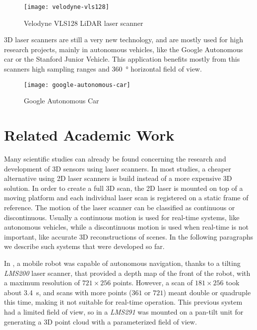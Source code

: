\begin{figure}[h]
    \centering
    \texttt{[image: velodyne-vls128]}
    \caption{Velodyne VLS128 LiDAR laser scanner}
    \label{fig:velodyne-vls128}
\end{figure}

3D laser scanners are still a very new technology, and are mostly used for high research projects, mainly in autonomous vehicles, like the Google Autonomous car \cite{google-self-driving} or the Stanford Junior Vehicle\cite{montemerlo08}. This application benefits mostly from this scanners high sampling ranges and \SI{360}{\degree} horizontal field of view.

\begin{figure}[h]
    \centering
    \texttt{[image: google-autonomous-car]}
    \caption{Google Autonomous Car}
    \label{fig:google-autonomous-car}
\end{figure}

\section{Related Academic Work}

Many scientific studies can already be found concerning the research and development of 3D sensors using laser scanners. In most studies, a cheaper alternative using 2D laser scanners is build instead of a more expensive 3D solution. In order to create a full 3D scan, the 2D laser is mounted on top of a moving platform and each individual laser scan is registered on a static frame of reference. The motion of the laser scanner can be classified as continuous or discontinuous. Usually a continuous motion is used for real-time systems, like autonomous vehicles, while a discontinuous motion is used when real-time is not important, like accurate 3D reconstructions of scenes. In the following paragraphs we describe such systems that were developed so far.

In \cite{surmann2003}, a mobile robot was capable of autonomous navigation, thanks to a tilting \textit{LMS200} laser scanner, that provided a depth map of the front of the robot, with a maximum resolution of $721\times256$ points. However, a scan of $181\times256$ took about \SI{3.4}{\second}, and scans with more points ($361$ or $721$) meant double or quadruple this time, making it not suitable for real-time operation. This previous system had a limited field of view, so in \cite{zcai05} a \textit{LMS291} was mounted on a pan-tilt unit for generating a 3D point cloud with a parameterized field of view.

